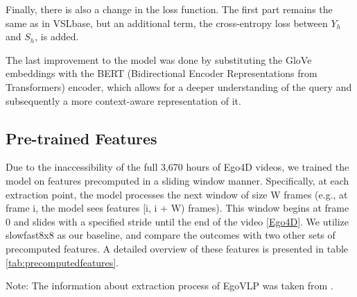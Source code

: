 \documentclass[10pt,twocolumn,letterpaper]{article}
\begin{document}
Finally, there is also a change in the loss function. The first part remains the same as in VSLbase, but an additional term, the cross-entropy loss between $Y_{h}$ and $S_{h}$, is added.

The last improvement to the model was done by substituting the GloVe embeddings with the BERT (Bidirectional Encoder Representations from Transformers) encoder, which allows for a deeper understanding of the query and subsequently a more context-aware representation of it.

\subsection{Pre-trained Features}
\label{subsec:features}
Due to the inaccessibility of the full 3,670 hours of Ego4D videos, we trained the model on features precomputed in a sliding window manner. Specifically, at each extraction point, the model processes the next window of size W frames (e.g., at frame i, the model sees features [i, i + W) frames). This window begins at frame 0 and slides with a specified stride until the end of the video [\href{https://ego4d-data.org/docs/data/features/}{Ego4D}]. We utilize slowfast8x8 as our baseline, and compare the outcomes with two other sets of precomputed features. A detailed overview of these features is presented in table \ref{tab:precomputedfeatures}.

\begin{table}[h]
\centering
\caption{Pre-computed Features for Ego4D}
\label{tab:precomputedfeatures}
\setlength{\tabcolsep}{4pt}
\renewcommand{\arraystretch}{1.2}

\begin{minipage}{\linewidth}
\vspace{0.1cm}  %
{\footnotesize * Note: The information about extraction process of EgoVLP was taken from \cite{egoVLP}.}  
\end{minipage}
\end{table}
\end{document}
